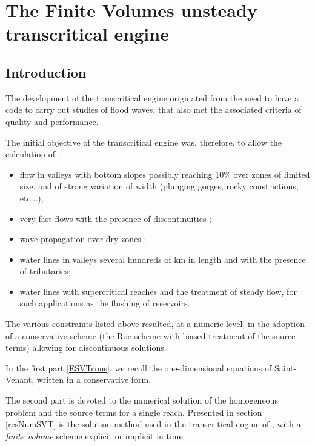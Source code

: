 \chapter{The Finite Volumes unsteady transcritical engine \mascaret{}}
\label{Chapter3}

\section{Introduction}

The development of the transcritical engine originated from the need to have a code to carry out studies of flood waves, that also met the associated criteria of quality and performance.

The initial objective of the transcritical engine was, therefore, to allow the calculation of :
\begin{itemize}
 \item flow in valleys with bottom slopes possibly reaching 10\% over zones of limited size, and of strong variation of width (plunging gorges, rocky constrictions, etc...);
 \item very fast flows with the presence of discontinuities ;
 \item wave propagation over dry zones ;
 \item water lines in valleys several hundreds of km in length and with the presence of tributaries;
 \item water lines with supercritical reaches and the treatment of steady flow, for such applications as the flushing of reservoirs.
\end{itemize}

The various constraints listed above resulted, at a numeric level, in the adoption of a conservative scheme (the Roe scheme with biased treatment of the source terms) allowing for discontinuous solutions.

In the first part \ref{ESVTcons}, we recall the one-dimensional equations of Saint-Venant, written in a conservative form.

The second part is devoted to the numerical solution of the homogeneous problem and the source terms for a single reach. Presented in section \ref{resNumSVT} is the solution method used in the transcritical engine of \mascaret{}, with a \textit{finite volume} scheme explicit or implicit in time.


